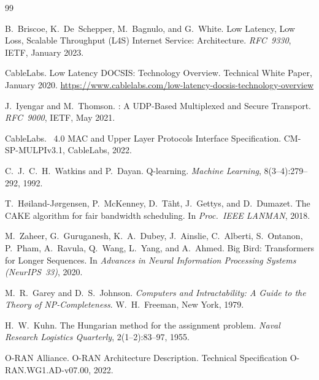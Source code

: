 ﻿\documentclass[a4paper,12pt]{article}
\theoremstyle{definition}
\begin{document}
\begin{thebibliography}{99}

B.~Briscoe, K.~De~Schepper, M.~Bagnulo, and G.~White.
\newblock Low Latency, Low Loss, Scalable Throughput (L4S) Internet Service:
  Architecture.
\newblock \textit{RFC~9330}, IETF, January 2023.

CableLabs.
\newblock Low Latency {DOCSIS}: Technology Overview.
\newblock Technical White Paper, January 2020.
\newblock \url{https://www.cablelabs.com/low-latency-docsis-technology-overview}

J.~Iyengar and M.~Thomson.
: A {UDP}-Based Multiplexed and Secure Transport.
\newblock \textit{RFC~9000}, IETF, May 2021.

CableLabs.
~4.0 MAC and Upper Layer Protocols Interface Specification.
\newblock CM-SP-MULPIv3.1, CableLabs, 2022.

C.~J.~C.~H.~Watkins and P.~Dayan.
\newblock Q-learning.
\newblock \textit{Machine Learning}, 8(3--4):279--292, 1992.

T.~H\o{}iland-J\o{}rgensen, P.~McKenney, D.~T\"{a}ht, J.~Gettys, and D.~Dumazet.
\newblock The {CAKE} algorithm for fair bandwidth scheduling.
\newblock In \textit{Proc.\ IEEE LANMAN}, 2018.

M.~Zaheer, G.~Guruganesh, K.~A.~Dubey, J.~Ainslie, C.~Alberti, S.~Ontanon,
  P.~Pham, A.~Ravula, Q.~Wang, L.~Yang, and A.~Ahmed.
\newblock Big Bird: Transformers for Longer Sequences.
\newblock In \textit{Advances in Neural Information Processing Systems
  (NeurIPS~33)}, 2020.

M.~R.~Garey and D.~S.~Johnson.
\newblock \textit{Computers and Intractability: A Guide to the Theory of
  {NP}-Completeness}.
\newblock W.~H.~Freeman, New York, 1979.

H.~W.~Kuhn.
\newblock The Hungarian method for the assignment problem.
\newblock \textit{Naval Research Logistics Quarterly}, 2(1--2):83--97, 1955.

O-RAN Alliance.
\newblock O-RAN Architecture Description.
\newblock Technical Specification O-RAN.WG1.AD-v07.00, 2022.


\end{thebibliography}
\end{document}
